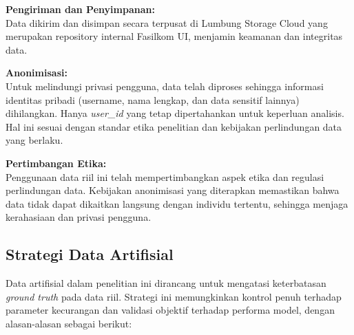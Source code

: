 \textbf{Pengiriman dan Penyimpanan:} \\
Data dikirim dan disimpan secara terpusat di Lumbung Storage Cloud yang merupakan repository internal Fasilkom UI, menjamin keamanan dan integritas data.

\textbf{Anonimisasi:} \\
Untuk melindungi privasi pengguna, data telah diproses sehingga informasi identitas pribadi (username, nama lengkap, dan data sensitif lainnya) dihilangkan. Hanya \textit{user\_id} yang tetap dipertahankan untuk keperluan analisis. Hal ini sesuai dengan standar etika penelitian dan kebijakan perlindungan data yang berlaku.

\textbf{Pertimbangan Etika:} \\
Penggunaan data riil ini telah mempertimbangkan aspek etika dan regulasi perlindungan data. Kebijakan anonimisasi yang diterapkan memastikan bahwa data tidak dapat dikaitkan langsung dengan individu tertentu, sehingga menjaga kerahasiaan dan privasi pengguna.

\subsection{Strategi Data Artifisial}
\label{sec:dataArtifisial}
Data artifisial dalam penelitian ini dirancang untuk mengatasi keterbatasan \textit{ground truth} pada data riil. Strategi ini memungkinkan kontrol penuh terhadap parameter kecurangan dan validasi objektif terhadap performa model, dengan alasan-alasan sebagai berikut:

